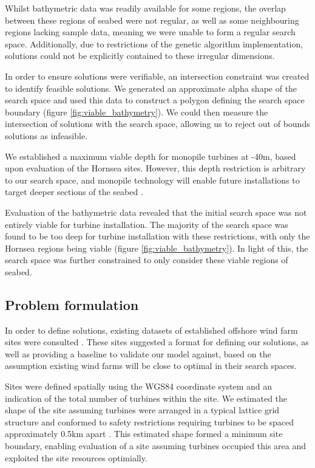 \documentclass[preprint,12pt]{elsarticle}
\begin{document}
Whilst bathymetric data was readily available for some regions, the overlap between these regions of seabed were not regular, as well as some neighbouring regions lacking sample data, meaning we were unable to form a regular search space. Additionally, due to restrictions of the genetic algorithm implementation, solutions could not be explicitly contained to these irregular dimensions. 

In order to ensure solutions were verifiable, an intersection constraint was created to identify feasible solutions. We generated an approximate alpha shape of the search space and used this data to construct a polygon defining the search space boundary (figure \ref{fig:viable_bathymetry}). We could then measure the intersection of solutions with the search space, allowing us to reject out of bounds solutions as infeasible.

We established a maximum viable depth for monopile turbines at -40m, based upon evaluation of the Hornsea sites. However, this depth restriction is arbitrary to our search space, and monopile technology will enable future installations to target deeper sections of the seabed \cite{kallehave2015optimization}. 

Evaluation of the bathymetric data revealed that the initial search space was not entirely viable for turbine installation. The majority of the search space was found to be too deep for turbine installation with these restrictions, with only the Hornsea regions being viable \cite{2019} (figure \ref{fig:viable_bathymetry}). In light of this, the search space was further constrained to only consider these viable regions of seabed.

\subsection{Problem formulation}
In order to define solutions, existing datasets of established offshore wind farm sites were consulted \cite{2022c}. These sites suggested a format for defining our solutions, as well as providing a baseline to validate our model against, based on the assumption existing wind farms will be close to optimal in their search spaces.

Sites were defined spatially using the WGS84 coordinate system \cite{Fell2001} and an indication of the total number of turbines within the site. We estimated the shape of the site assuming turbines were arranged in a typical lattice grid structure and conformed to safety restrictions requiring turbines to be spaced approximately 0.5km apart \cite{SchallenbergRodriguez2018}. This estimated shape formed a minimum site boundary, enabling evaluation of a site assuming turbines occupied this area and exploited the site resources optimially.
\end{document}
